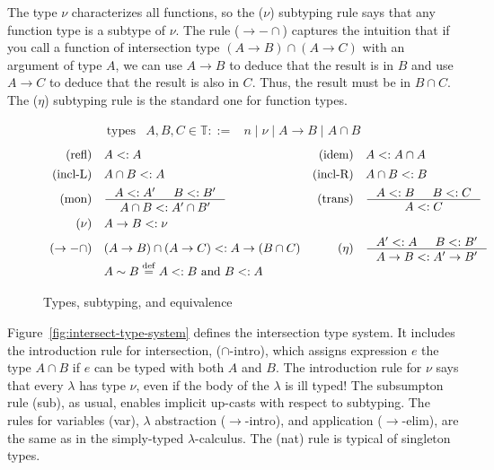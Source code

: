 \documentclass{tufte-handout}
\newcommand{\defeq}[0]{\overset{\mathrm{def}}{=}}
\begin{document}
The type $\nu$ characterizes all functions, so the ($\nu$) subtyping
rule says that any function type is a subtype of $\nu$. The rule
($\to{-}\cap$) captures the intuition that if you call a function of
intersection type $(A \to B) \cap (A \to C)$ with an argument of type
$A$, we can use $A \to B$ to deduce that the result is in $B$ and use
$A \to C$ to deduce that the result is also in $C$. Thus, the result
must be in $B \cap C$. The ($\eta$) subtyping rule is the standard one
for function types.

\begin{figure}
\[
\begin{array}{lrl}
  \text{types} & A,B,C \in \mathbb{T} ::= & n \mid \nu \mid A \to B \mid A \cap B
\end{array}
\]
\[
\begin{array}{rlrl}
  \text{(refl)} &  A <: A & \text{(idem)} & A <: A \cap A \\[1ex]
  \text{(incl-L)} & A \cap B <: A & \text{(incl-R)} & A \cap B <: B\\[1ex]
  \text{(mon)} & \inference{A <: A' & B <: B'}{A \cap B <: A' \cap B'} &
  \text{(trans)} & \inference{A <: B & B <: C}{A <: C} \\[2ex]
  \text{($\nu$)} & A \to B <: \nu \\[1ex]
  \text{($\to{-}\cap$)} & (A \to B) \cap (A \to C) <: A \to (B \cap C) &
  \text{($\eta$)} & \inference{A' <: A & B <: B'}
       {A \to B <: A' \to B'} \\[1ex]
  & A \sim B \defeq A <: B \text{ and } B <: A
\end{array}
\]
\caption{Types, subtyping, and equivalence}
\label{fig:intersection-types}
\end{figure}


Figure~\ref{fig:intersect-type-system} defines the intersection type
system.  It includes the introduction rule for intersection,
($\cap$-intro), which assigns expression $e$ the type $A \cap B$ if
$e$ can be typed with both $A$ and $B$.  The introduction rule for
$\nu$ says that every $\lambda$ has type $\nu$, even if the body of
the $\lambda$ is ill typed!  The subsumpton rule (sub), as usual,
enables implicit up-casts with respect to subtyping.  The rules for
variables (var), $\lambda$ abstraction ($\to$-intro), and application
($\to$-elim), are the same as in the simply-typed $\lambda$-calculus.
The (nat) rule is typical of singleton types.
\end{document}

